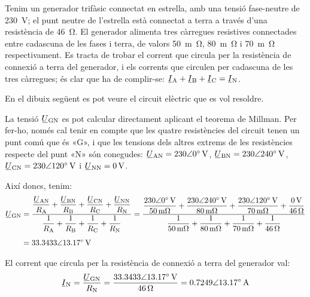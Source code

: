 \begin{exemple}\label{ex:MillmanTrifNeutre}
	\addcontentsxms{\MillmanTrifNeutre}	
    Tenim un generador trifàsic connectat en estrella, amb una tensió fase-neutre de \qty{230}{V}; el punt neutre de l'estrella està connectat a terra a través d'una resistència de \qty{46}{\ohm}. El generador alimenta tres càrregues resistives connectades entre cadascuna de les fases i terra, de valors \qty{50}{m\ohm}, \qty{80}{m\ohm} i \qty{70}{m\ohm} respectivament. Es tracta de trobar el corrent que circula per la resistència de connexió a terra del generador, i els corrents que circulen per cadascuna de les tres càrregues; és clar que ha de complir-se: $\cmplx{I}\ped{A} + \cmplx{I}\ped{B} + \cmplx{I}\ped{C} = \cmplx{I}\ped{N}$.

    En el dibuix  següent es pot veure el circuit elèctric que es vol resoldre.

	 \begin{center}
		
	\end{center}

    La tensió $\cmplx{U}\ped{GN}$ es pot calcular directament aplicant el teorema de Millman. Per fer-ho, només cal tenir en compte que les quatre resistències del circuit tenen un punt comú que és «G», i que les tensions dels altres extrems de les resistències respecte del punt «N» són conegudes: $\cmplx{U}\ped{AN}=\complexqty{230:0}{V}$, $\cmplx{U}\ped{BN}=\complexqty{230:240}{V}$, $\cmplx{U}\ped{CN}=\complexqty{230:120}{V}$ i  $\cmplx{U}\ped{NN}=\qty{0}{V}$.

    Així doncs, tenim:
    \begin{align*}
    \cmplx{U}\ped{GN} &= \frac{ \dfrac{\cmplx{U}\ped{AN}}{R\ped{A}} + \dfrac{\cmplx{U}\ped{BN}}{R\ped{B}} + \dfrac{\cmplx{U}\ped{CN}}{R\ped{C}} + \dfrac{\cmplx{U}\ped{NN}}{R\ped{N}}} { \dfrac{1}{R\ped{A}} + \dfrac{1}{R\ped{B}} + \dfrac{1}{R\ped{C}} + \dfrac{1}{R\ped{N}} } =
    \frac{\dfrac{\complexqty{230:0}{V}}{\qty{50}{m\ohm}}+\dfrac{\complexqty{230:240}{V}}{\qty{80}{m\ohm}}+
    \dfrac{\complexqty{230:120}{V}}{\qty{70}{m\ohm}} + \dfrac{\qty{0}{V}}{\qty{46}{\ohm}} }{\dfrac{1}{\qty{50}{m\ohm}}+\dfrac{1}{\qty{80}{m\ohm}}+
    \dfrac{1}{\qty{70}{m\ohm}}+\dfrac{1}{\qty{46}{\ohm}}} \\[1ex]
    &=\complexqty{33,3433:13,17}{V}
    \end{align*}

    El corrent  que circula per la resistència de connexió a terra del generador val:
    \[
    \cmplx{I}\ped{N} = \frac{\cmplx{U}\ped{GN}}{R\ped{N}} = \frac{\complexqty{33,3433:13,17}{V}}{\qty{46}{\ohm}}
    = \complexqty{0,7249:13,17}{A}
    \]


\end{exemple}
